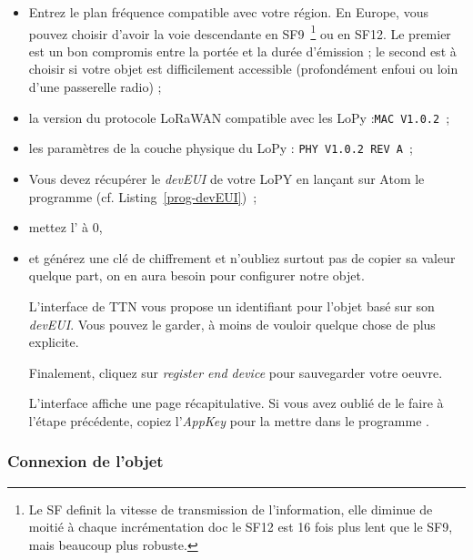 \begin{itemize}
    \item Entrez le plan fréquence compatible avec votre région. En Europe, vous pouvez choisir d'avoir la voie descendante en SF9~\footnote{Le \acl{SF} definit la vitesse de transmission de l'information, elle diminue de moitié à chaque incrémentation doc le SF12 est 16 fois plus lent que le SF9, mais beaucoup plus robuste.} ou en SF12. Le premier est un bon compromis entre la portée et la durée d'émission ; le second est à choisir si votre objet est difficilement accessible (profondément enfoui ou loin d'une passerelle radio) ;
    \item la version du protocole LoRaWAN compatible avec les LoPy  :\texttt{MAC V1.0.2}~;
    \item les paramètres de la couche physique du LoPy : \texttt{PHY V1.0.2 REV A}~;
    \item Vous devez récupérer le \textit{devEUI} de votre LoPY en lançant sur Atom le programme  (cf. Listing~\vref{prog-devEUI})~;
    \item mettez l'\textit{} à 0,
    \item et générez une clé de chiffrement \textit{} et n'oubliez surtout pas de copier sa valeur quelque part, on en aura besoin pour configurer notre objet.
    
         \vspace{1em}

L'interface de TTN vous propose un identifiant pour l'objet basé sur son \textit{devEUI}. Vous pouvez le garder, à moins de vouloir quelque chose de plus explicite.

         \vspace{1em}

Finalement, cliquez sur \textit{register end device} pour sauvegarder votre oeuvre.

         \vspace{1em}

L'interface affiche une page récapitulative. Si vous avez oublié de le faire à l'étape précédente, copiez l'\textit{AppKey} pour la mettre dans le programme .
\end{itemize}

\subsubsection*{Connexion de l'objet}


